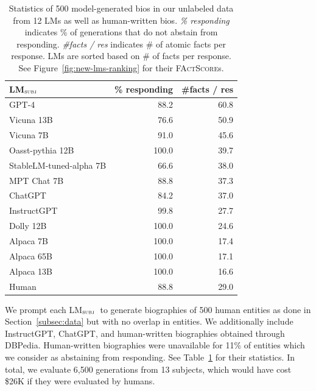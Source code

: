 \documentclass[11pt]{article}
\makeatletter
\newcommand*\myfontsize{%
  \@setfontsize\myfontsize{8}{9}%
}
\newcommand{\ourScores}{\textsc{FActScore}s}
\newcommand{\subjectLM}{LM$_\textsc{subj}$}
\makeatother
\begin{document}
\begin{table}[t]
    \center
    \footnotesize
    \begin{tabular}{l @{\hspace{-0.8em}} r r
        }
        \toprule        
           \subjectLM & \% responding & \#facts / res \\
        \midrule
            GPT-4       & 88.2 & 60.8 \\
            Vicuna 13B & 76.6 & 50.9 \\
            Vicuna 7B & 91.0 & 45.6 \\
            Oasst-pythia 12B & 100.0 & 39.7 \\
            StableLM-tuned-alpha 7B &  66.6 & 38.0 \\
            MPT Chat 7B & 88.8 & 37.3 \\
            ChatGPT     & 84.2 & 37.0 \\
            InstructGPT & 99.8 & 27.7 \\
            Dolly 12B & 100.0 & 24.6 \\
            Alpaca 7B & 100.0 & 17.4 \\
            Alpaca 65B & 100.0 & 17.1 \\
            Alpaca 13B & 100.0 & 16.6 \\ 
        \midrule
            Human & 88.8 & 29.0 \\
        \bottomrule
    \end{tabular}
    \caption{
        Statistics of 500 model-generated bios in our unlabeled data from 12 LMs as well as human-written bios.
        {\em \% responding} indicates \% of generations that do not abstain from responding.
        {\em \#facts / res} indicates \# of atomic facts per response.
        LMs are sorted based on \# of facts per response.
        See Figure~\ref{fig:new-lms-ranking} for their \ourScores.
    }\label{tab:new-lms-statistics}
\end{table}

\vspace{.3em}
We prompt each \subjectLM\ to generate biographies of 500 human entities as done in Section~\ref{subsec:data} but with no overlap in entities.
We additionally include InstructGPT, ChatGPT, and human-written biographies obtained through DBPedia. %
Human-written biographies were unavailable for 11\% of entities which we consider as abstaining from responding.
See Table~\ref{tab:new-lms-statistics} for their statistics.
In total, we evaluate 6,500 generations from 13 subjects, which would have cost \$26K if they were evaluated by humans.
\end{document}
